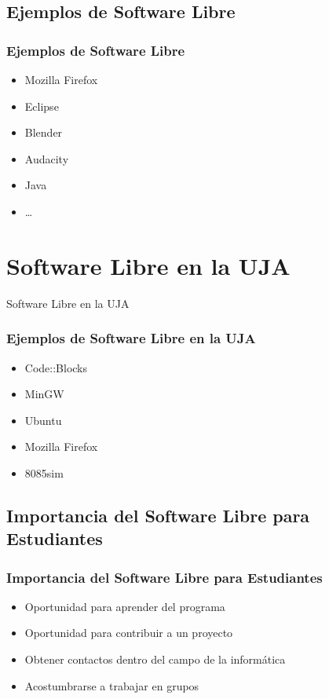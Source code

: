 \documentclass[xetex]{beamer}
\begin{document}

\subsection{Ejemplos de Software Libre}
\begin{frame}
    \frametitle{Ejemplos de Software Libre}
    \pause{}
    \begin{itemize}[<+->]
        \item Mozilla Firefox
        \item Eclipse
        \item Blender
        \item Audacity
        \item Java
        \item \ldots
    \end{itemize}
\end{frame}


\section{Software Libre en la UJA}
\begin{frame}
    \centering \Huge Software Libre en la UJA
\end{frame}


\begin{frame}
    \frametitle{Ejemplos de Software Libre en la UJA}
    \pause{}
    \begin{itemize}[<+->]
        \item Code::Blocks
        \item MinGW
        \item Ubuntu
        \item Mozilla Firefox
        \item 8085sim
    \end{itemize}
\end{frame}


\subsection{Importancia del Software Libre para Estudiantes}
\begin{frame}[t]
    \frametitle{Importancia del Software Libre para Estudiantes}
    \pause{}
    \begin{itemize}[<+->]
        \item Oportunidad para aprender del programa
        \item Oportunidad para contribuir a un proyecto
        \item Obtener contactos dentro del campo de la informática
        \item Acostumbrarse a trabajar en grupos
    \end{itemize}
\end{frame}
\end{document}
